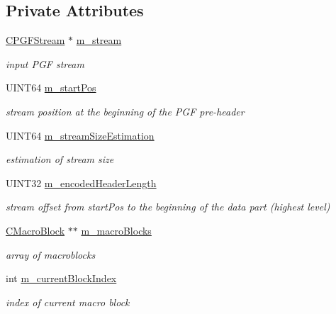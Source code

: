 \subsection*{Private Attributes}
\begin{DoxyCompactItemize}
\item 
\mbox{\hyperlink{classCPGFStream}{C\+P\+G\+F\+Stream}} $\ast$ \mbox{\hyperlink{classCDecoder_a4a083ad657a4f6236603c3090b44b2c5}{m\+\_\+stream}}
\begin{DoxyCompactList}\small\item\em input P\+GF stream \end{DoxyCompactList}\item 
U\+I\+N\+T64 \mbox{\hyperlink{classCDecoder_a56f84d5e2dc9f94737e9ff76a017eab7}{m\+\_\+start\+Pos}}
\begin{DoxyCompactList}\small\item\em stream position at the beginning of the P\+GF pre-\/header \end{DoxyCompactList}\item 
U\+I\+N\+T64 \mbox{\hyperlink{classCDecoder_a6562d817189d48cfed14b5e8b921e180}{m\+\_\+stream\+Size\+Estimation}}
\begin{DoxyCompactList}\small\item\em estimation of stream size \end{DoxyCompactList}\item 
U\+I\+N\+T32 \mbox{\hyperlink{classCDecoder_aa59513d248af5c39dee8ae193876552b}{m\+\_\+encoded\+Header\+Length}}
\begin{DoxyCompactList}\small\item\em stream offset from start\+Pos to the beginning of the data part (highest level) \end{DoxyCompactList}\item 
\mbox{\hyperlink{classCDecoder_1_1CMacroBlock}{C\+Macro\+Block}} $\ast$$\ast$ \mbox{\hyperlink{classCDecoder_a7acf80ff3cb6193afed753a44a8d08fa}{m\+\_\+macro\+Blocks}}
\begin{DoxyCompactList}\small\item\em array of macroblocks \end{DoxyCompactList}\item 
int \mbox{\hyperlink{classCDecoder_a2e3c3a814d7bc3766e35302367f8d9ae}{m\+\_\+current\+Block\+Index}}
\begin{DoxyCompactList}\small\item\em index of current macro block \end{DoxyCompactList}\item 
$$
\end{DoxyCompactItemize}
